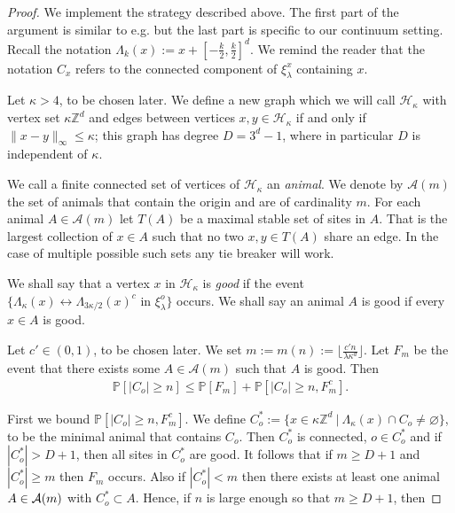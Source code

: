 \documentclass[a4paper,12pt]{scrartcl}
\renewcommand{\P}{\mathbb{P}}
\newcommand{\ints}{\mathbb{Z}}
\newcommand{\inxi}[1]{\text{ in }\xi_{#1}}
\theoremstyle{definition}
\theoremstyle{remark}
\begin{document}
  \begin{proof}
    We implement the strategy described above.
    The first part of the argument is similar to
    e.g.  \cite[Theorem 3.7]{duminil-intro} but the last part is specific to our continuum setting. Recall the notation $\Lambda_k(x) := x + [-\frac k2,\frac k2]^d$. We remind the reader that the notation $C_x$ refers to the connected component of $\xi_\lambda^x$ containing $x$.

    Let $\kappa > 4$, to be chosen later. We define a new graph which we will call $\mathcal H_\kappa$ with vertex set $\kappa \ints^d$ and edges between vertices $x,y\in \mathcal H_\kappa$ if and only if $\|x-y\|_\infty \leq\kappa$; this graph has degree $D=3^d-1$, where in particular $D$ is independent of $\kappa$.

    We call a finite connected set of vertices of $\mathcal H_\kappa$ an \emph{animal}. We denote by $\mathcal A(m)$ the set of animals that contain the origin and are of cardinality $m$. For each animal $A\in\mathcal A(m)$ let $T(A)$ be a maximal stable set of sites in $A$. That is the largest collection of $x\in A$ such that no two $x,y\in T(A)$ share an edge. In the case of multiple possible such sets any tie breaker will work.

    We shall say that a vertex $x$ in $\mathcal H_\kappa$ is \emph{good} if the event $\{\Lambda_{\kappa}(x)\leftrightarrow \Lambda_{3 \kappa/2}(x)^c \inxi{\lambda}^o\}$ occurs. We shall say an animal $A$ is good if every $x\in A$ is good.

    Let $c'\in(0,1)$, to be chosen later.
    We set $m:=m(n) := \lfloor \frac{c'n}{\lambda\kappa^d}\rfloor$. Let $F_m$ be the event that there exists some $A\in\mathcal A(m)$ such that $A$ is good. Then
    \begin{align}
      \P[|C_o|\geq n]
      \leq
      \P[ F_m] + \P[|C_o|\geq n ,  F_m^c].
      \label{e:splitevent}
    \end{align}

    First we bound $\P[|C_o|\geq n ,  F_m^c]$.
    We define $C^*_o:=\{x\in\kappa\ints^d\ |\ \Lambda_\kappa(x)\cap C_o\neq \varnothing\}$, to be the minimal animal that contains $C_o$.
    Then $C_o^*$ is connected, $o \in C_o^*$ and if $|C_o^*| > D+1$, then
    all sites in $C_o^*$ are good.
    It follows that if $m \geq D+1$ and $|C_o^*| \geq m$ then $F_m$ occurs.
    Also if $|C_o^*| < m$ then there exists at least one
    animal $A \in {\cal A}(m)$ with $C_o^* \subset A$.
    Hence, if $n$ is large enough so that $m \geq D+1$, then


\end{proof}
\end{document}
